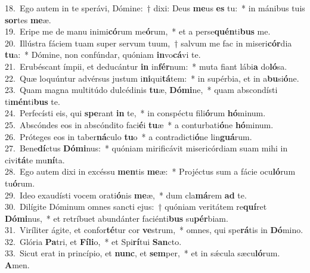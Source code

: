 {18.~}Ego autem in te sperávi, Dómine:~† dixi: Deus \textbf{me}us \textbf{es} tu:~* in mánibus tuis \textbf{sor}tes \textbf{me}æ.\\
{19.~}Eripe me de manu inimi\textbf{có}rum me\textbf{ó}rum,~* et a perse\textbf{quén}ti\textbf{bus} me.\\
{20.~}Illústra fáciem tuam super servum tuum,~† salvum me fac in miseri\textbf{cór}dia \textbf{tu}a:~* Dómine, non confúndar, quóniam \textbf{in}vo\textbf{cá}vi te.\\
{21.~}Erubéscant ímpii, et deducántur \textbf{in} in\textbf{fér}num:~* muta fiant lábi\textbf{a} do\textbf{ló}sa.\\
{22.~}Quæ loquúntur advérsus justum i\textbf{ni}qui\textbf{tá}tem:~* in supérbia, et in a\textbf{bu}si\textbf{ó}ne.\\
{23.~}Quam magna multitúdo dulcédinis \textbf{tu}æ, \textbf{Dó}\textbf{mi}ne,~* quam abscondísti ti\textbf{mén}ti\textbf{bus} te.\\
{24.~}Perfecísti eis, qui \textbf{spe}rant \textbf{in} te,~* in conspéctu fili\textbf{ó}rum \textbf{hó}minum.\\
{25.~}Abscóndes eos in abscóndito faci\textbf{é}i \textbf{tu}æ~* a conturbati\textbf{ó}ne \textbf{hó}minum.\\
{26.~}Próteges eos in taber\textbf{ná}culo \textbf{tu}o~* a contradicti\textbf{ó}ne lin\textbf{guá}rum.\\
{27.~}Bene\textbf{dí}ctus \textbf{Dó}\textbf{mi}nus:~* quóniam mirificávit misericórdiam suam mihi in civi\textbf{tá}te mu\textbf{ní}ta.\\
{28.~}Ego autem dixi in excéssu \textbf{men}tis \textbf{me}æ:~* Projéctus sum a fácie ocu\textbf{ló}rum tu\textbf{ó}rum.\\
{29.~}Ideo exaudísti vocem orati\textbf{ó}nis \textbf{me}æ,~* dum cla\textbf{má}rem \textbf{ad} te.\\
{30.~}Dilígite Dóminum omnes sancti ejus:~† quóniam veritátem re\textbf{quí}ret \textbf{Dó}\textbf{mi}nus,~* et retríbuet abundánter faciénti\textbf{bus} su\textbf{pér}biam.\\
{31.~}Viríliter ágite, et confor\textbf{té}tur cor \textbf{ve}strum,~* omnes, qui spe\textbf{rá}tis in \textbf{Dó}mino.\\
{32.~}Glória \textbf{Pa}tri, et \textbf{Fí}\textbf{li}o,~* et Spi\textbf{rí}tui \textbf{San}cto.\\
{33.~}Sicut erat in princípio, et \textbf{nunc}, et \textbf{sem}per,~* et in sǽcula sæcu\textbf{ló}rum. \textbf{A}men.\\
